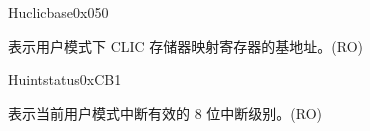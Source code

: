 \begin{register}{H}{uclicbase}{0x050}\label{regdesc:UCLICBASE_REG}
%
\regnewline%
\begin{regdesc}\begin{reglist}
\label{fielddesc:UCLICBASE}\item [UCLICBASE] 表示用户模式下 CLIC 存储器映射寄存器的基地址。(RO)
\end{reglist}\end{regdesc}
\end{register}

\begin{register}{H}{uintstatus}{0xCB1}
\label{regdesc:UINTSTATUS}
%
%
\regnewline%
\begin{regdesc}\begin{reglist}
\label{fielddesc:UINTSTATUS_UIL}\item [UIL] 表示当前用户模式中断有效的 8 位中断级别。(RO)
\end{reglist}\end{regdesc}
\end{register}





